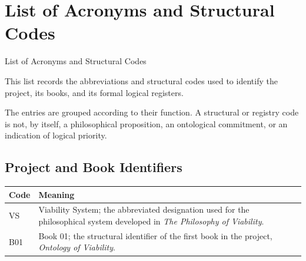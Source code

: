 
%
%
%



\chapter*{List of Acronyms and Structural Codes}
         {List of Acronyms and Structural Codes}


This list records the abbreviations and structural codes used to identify
the project, its books, and its formal logical registers.

The entries are grouped according to their function. A structural or
registry code is not, by itself, a philosophical proposition, an ontological
commitment, or an indication of logical priority.



\section*{Project and Book Identifiers}

\begin{center}
\begin{tabular}{|p{}|p{}|}
\hline
\textbf{Code} & \textbf{Meaning} \\
\hline
VS
&
Viability System; the abbreviated designation used for the
philosophical system developed in
\textit{The Philosophy of Viability}.
\\
\hline
B01
&
Book 01; the structural identifier of the first book in the
project, \textit{Ontology of Viability}.
\\
\hline
\end{tabular}
\end{center}


